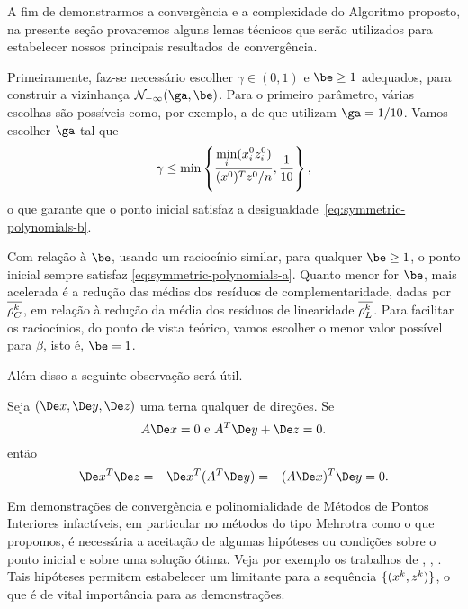 A fim de demonstrarmos a convergência e a complexidade do Algoritmo proposto, na presente seção provaremos alguns lemas técnicos que serão utilizados para estabelecer nossos principais resultados de convergência. 

Primeiramente, faz-se necessário  escolher  $\gamma\in(0,1)$  e $\be\geq 1$ adequados, para construir a vizinhança $\Nset_{-\infty}(\ga,\be)$. Para o primeiro parâmetro, várias escolhas são possíveis como, por exemplo, a de 
\textcite{Colombo:2008ia} que utilizam $\ga = 1/10$. Vamos escolher $\ga$ tal que  
\[
\gamma \leq  \min\left\{ \frac{\displaystyle \min_{i}(x^0_{i} z^0_{i} )}{(x^0 )^Tz^0 /n}, \frac{1}{10}\right\},
\]
o que garante que o ponto inicial satisfaz a desigualdade~\eqref{eq:symmetric-polynomials-b}.

Com relação à $\be$,  usando um raciocínio similar, para qualquer  $\be\geq 1$, o ponto inicial sempre satisfaz \eqref{eq:symmetric-polynomials-a}. Quanto menor for $\be$, mais acelerada é a redução  das médias dos resíduos de complementaridade, dadas por $\overline{\rho_C^{k}} $, em relação à redução da média dos resíduos de linearidade $\overline{\rho_L^{k}}$. Para facilitar os raciocínios, do ponto de vista teórico, vamos escolher o menor valor possível para $\beta$, isto é, $\be=1$.

Além disso a seguinte observação será  útil.


\begin{obs}
	Seja  $(\Dex,\Dey,\Dez)$ uma terna qualquer de direções. Se 
\begin{equation}
	\label{eq:Ax0-ATyz0}
	A\Dex=0 \text{ e } A^T\Dey + \Dez = 0.
\end{equation}
então
\begin{equation}
	\label{eq:xTziszero}
	\Dex^T\Dez =  - \Dex^T(A^T\Dey)  = -(A\Dex)^T\Dey = 0.
\end{equation}
\end{obs}



Em demonstrações de convergência e polinomialidade de Métodos de Pontos Interiores  infactíveis, em particular no métodos do tipo Mehrotra como o que propomos,  é  necessária a aceitação de algumas hipóteses ou condições sobre o ponto inicial e  sobre uma solução ótima. Veja por exemplo os trabalhos de \textcite{Wright:1994jd}, \textcite[cap. 6]{Wright:Primal-dual-interior-point:1997h}, \textcite{Wright:1996kj,Zhang:2006ic,Zhang:1994fz,Zhang:1995fu}. Tais hipóteses permitem estabelecer um limitante para a sequência $\{(x^{k},z^{k})\}$, o que é de vital importância para as demonstrações.

